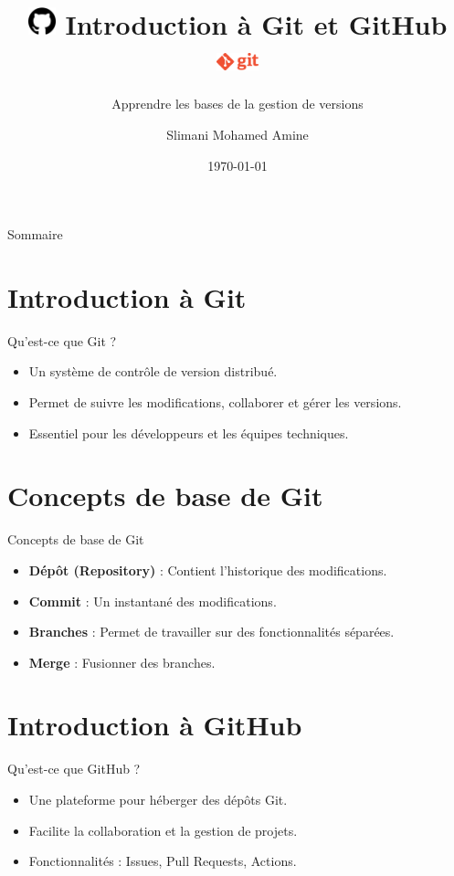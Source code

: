 \documentclass{clbeamer2024}
\title{
	\includegraphics[width=0.8cm]{logos/Github.png} \hfill
	Introduction à Git et GitHub \hfill
	\includegraphics[width=1.2cm]{logos/Git-Logo.png}
}
\subtitle{Apprendre les bases de la gestion de versions}
\author{Slimani Mohamed Amine}
\institute{}
\date{\today}
\begin{document}
\setcounter{framenumber}{-1}
\frame{\titlepage}



\begin{frame}{Sommaire}
	\tableofcontents
\end{frame}

\section{Introduction à Git}
\begin{frame}{Qu'est-ce que Git ?}
	\begin{itemize}
		\item Un système de contrôle de version distribué.
		\item Permet de suivre les modifications, collaborer et gérer les versions.
		\item Essentiel pour les développeurs et les équipes techniques.
	\end{itemize}
\end{frame}

\section{Concepts de base de Git}
\begin{frame}{Concepts de base de Git}
	\begin{itemize}
		\item \textbf{Dépôt (Repository)} : Contient l'historique des modifications.
		\item \textbf{Commit} : Un instantané des modifications.
		\item \textbf{Branches} : Permet de travailler sur des fonctionnalités séparées.
		\item \textbf{Merge} : Fusionner des branches.
	\end{itemize}
\end{frame}

\section{Introduction à GitHub}
\begin{frame}{Qu'est-ce que GitHub ?}
	\begin{itemize}
		\item Une plateforme pour héberger des dépôts Git.
		\item Facilite la collaboration et la gestion de projets.
		\item Fonctionnalités : Issues, Pull Requests, Actions.
	\end{itemize}
\end{frame}
\end{document}
